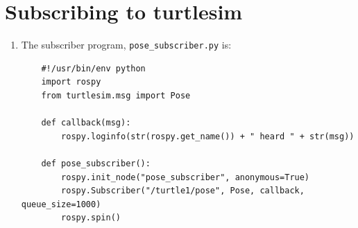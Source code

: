 \documentclass{article}
\begin{document}
    \section{Subscribing to turtlesim}
    \begin{enumerate}
        \item The subscriber program, \texttt{pose\_subscriber.py} is:
        \begin{verbatim}
    #!/usr/bin/env python
    import rospy 
    from turtlesim.msg import Pose

    def callback(msg):
        rospy.loginfo(str(rospy.get_name()) + " heard " + str(msg)) 

    def pose_subscriber():
        rospy.init_node("pose_subscriber", anonymous=True)
        rospy.Subscriber("/turtle1/pose", Pose, callback, queue_size=1000)
        rospy.spin()


\end{verbatim}
\end{enumerate}
\end{document}
